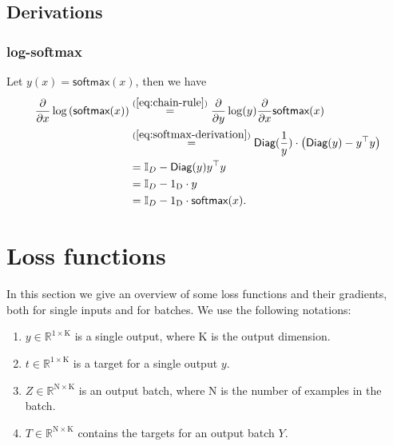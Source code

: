 \documentclass{article}
\newcommand{\const}[1]{\ensuremath{\mathrm{#1}}} %
\newcommand{\func}[1]{\ensuremath{\textsf{#1}}} %
\newcommand{\Partial}[1]{\frac{\partial}{\partial #1}}
\newcommand{\Reals}{\mathbb{R}}
\begin{document}
\subsection{Derivations}

\subsubsection*{log-softmax}
Let $y(x) = \func{softmax}(x)$, then we have
\begin{align} \label{eq:log-softmax-derivation}
\begin{split}
    \Partial{x} \log \left( \func{softmax}(x) \right)
    & \overset{(\ref{eq:chain-rule})}{=}
    \Partial{y} \log(y) \Partial{x} \func{softmax}(x)
    \\
    & \overset{(\ref{eq:softmax-derivation})}{=}
    \func{Diag}(\frac{1}{y}) \cdot 
        \left( \func{Diag}(y) -y^\top y \right)
    \\
    &= \mathbb{I}_D - \func{Diag}(y) y^\top y
    \\
    &= \mathbb{I}_D - 1_\const{D} \cdot y
    \\
    &= \mathbb{I}_D - 1_\const{D} \cdot \func{softmax}(x).
\end{split}    
\end{align}

\section{Loss functions} \label{section:loss-functions}
In this section we give an overview of some loss functions and their gradients, both for single inputs and for batches. We use the following notations:
\begin{enumerate}
    \item $y \in \Reals^{1 \times \const{K}}$ is a single output, where $\const{K}$ is the output dimension.
    \item $t \in \Reals^{1 \times \const{K}}$ is a target for a single output $y$.
    \item $Z \in \Reals^{\const{N} \times \const{K}}$ is an output batch, where $\const{N}$ is the number of examples in the batch.
    \item $T \in \Reals^{\const{N} \times \const{K}}$ contains the targets for an output batch $Y$.
\end{enumerate}
\end{document}
